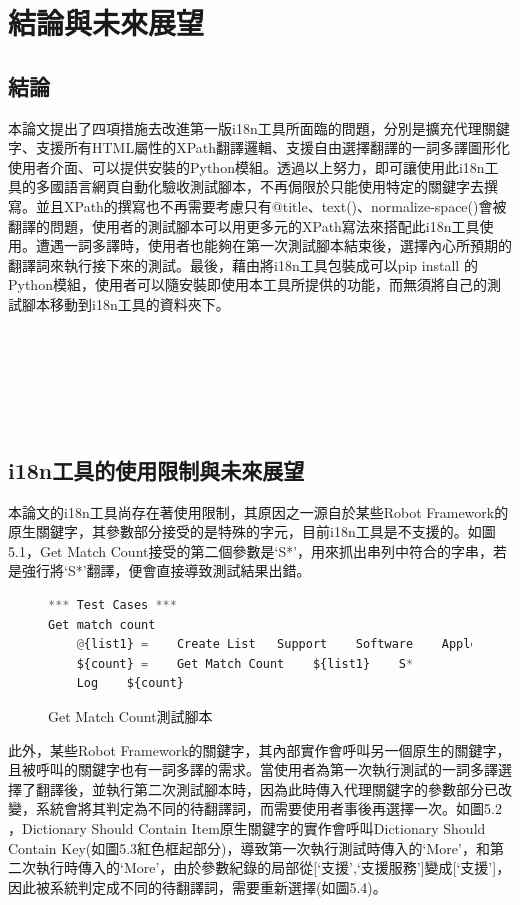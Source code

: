 \chapter{結論與未來展望}

\section{結論}
本論文提出了四項措施去改進第一版i18n工具所面臨的問題，分別是擴充代理關鍵字、支援所有HTML屬性的XPath翻譯邏輯、支援自由選擇翻譯的一詞多譯圖形化使用者介面、可以提供安裝的Python模組。透過以上努力，即可讓使用此i18n工具的多國語言網頁自動化驗收測試腳本，不再侷限於只能使用特定的關鍵字去撰寫。並且XPath的撰寫也不再需要考慮只有@title、text()、normalize-space()會被翻譯的問題，使用者的測試腳本可以用更多元的XPath寫法來搭配此i18n工具使用。遭遇一詞多譯時，使用者也能夠在第一次測試腳本結束後，選擇內心所預期的翻譯詞來執行接下來的測試。最後，藉由將i18n工具包裝成可以pip install 的Python模組，使用者可以隨安裝即使用本工具所提供的功能，而無須將自己的測試腳本移動到i18n工具的資料夾下。

\hspace*{\fill} \\
\\ \hspace*{\fill} \\
\\ \hspace*{\fill} \\
\section{i18n工具的使用限制與未來展望}
本論文的i18n工具尚存在著使用限制，其原因之一源自於某些Robot Framework的原生關鍵字，其參數部分接受的是特殊的字元，目前i18n工具是不支援的。如圖5.1，Get Match Count接受的第二個參數是‘S*’，用來抓出串列中符合的字串，若是強行將‘S*’翻譯，便會直接導致測試結果出錯。

\begin{figure}[H]
\centering
\begin{lstlisting}[language={python}]
*** Test Cases ***
Get match count
    @{list1} =    Create List   Support    Software    Apple
    ${count} =    Get Match Count    ${list1}    S*
    Log    ${count} 
\end{lstlisting}
\caption{Get Match Count測試腳本}
\end{figure}

此外，某些Robot Framework的關鍵字，其內部實作會呼叫另一個原生的關鍵字，且被呼叫的關鍵字也有一詞多譯的需求。當使用者為第一次執行測試的一詞多譯選擇了翻譯後，並執行第二次測試腳本時，因為此時傳入代理關鍵字的參數部分已改變，系統會將其判定為不同的待翻譯詞，而需要使用者事後再選擇一次。如圖5.2 ，Dictionary Should Contain Item原生關鍵字的實作會呼叫Dictionary Should Contain Key(如圖5.3紅色框起部分)，導致第一次執行測試時傳入的‘More’，和第二次執行時傳入的‘More’，由於參數紀錄的局部從[‘支援’,‘支援服務’]變成[‘支援’]，因此被系統判定成不同的待翻譯詞，需要重新選擇(如圖5.4)。\\

